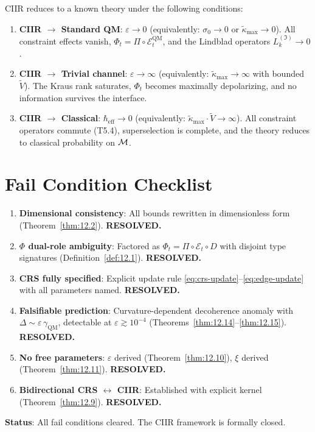 \begin{corollary}\label{cor:12.3}
CIIR reduces to a known theory under the following conditions:
\begin{enumerate}
  \item \textbf{CIIR $\to$ Standard QM}: $\varepsilon \to 0$ (equivalently:
    $\sigma_0 \to 0$ or $\tilde{\kappa}_{\max} \to 0$).  All constraint
    effects vanish, $\Phi_t = \Pi \circ \mathcal{E}_t^{\mathrm{QM}}$,
    and the Lindblad operators $L_k^{(\mathfrak{I})} \to 0$.
  \item \textbf{CIIR $\to$ Trivial channel}: $\varepsilon \to \infty$
    (equivalently: $\tilde{\kappa}_{\max} \to \infty$ with bounded $\tilde{V}$).
    The Kraus rank saturates, $\Phi_t$ becomes maximally depolarizing,
    and no information survives the interface.
  \item \textbf{CIIR $\to$ Classical}: $\hbar_{\mathrm{eff}} \to 0$
    (equivalently: $\tilde{\kappa}_{\max} \cdot \tilde{V} \to \infty$).
    All constraint operators commute (T5.4), superselection is complete,
    and the theory reduces to classical probability on $\mathcal{M}$.
\end{enumerate}
\end{corollary}

\section{Fail Condition Checklist}
\label{sec:failcheck}

\begin{enumerate}
  \item[\ding{51}] \textbf{Dimensional consistency}: All bounds rewritten in
    dimensionless form (Theorem~\ref{thm:12.2}).  \textbf{RESOLVED.}
  \item[\ding{51}] \textbf{$\Phi$ dual-role ambiguity}: Factored as
    $\Phi_t = \Pi \circ \mathcal{E}_t \circ D$ with disjoint type
    signatures (Definition~\ref{def:12.1}).  \textbf{RESOLVED.}
  \item[\ding{51}] \textbf{CRS fully specified}: Explicit update rule
    \eqref{eq:crs-update}--\eqref{eq:edge-update} with all parameters
    named.  \textbf{RESOLVED.}
  \item[\ding{51}] \textbf{Falsifiable prediction}: Curvature-dependent
    decoherence anomaly with $\Delta \sim \varepsilon\,\gamma_{\mathrm{QM}}$,
    detectable at $\varepsilon \gtrsim 10^{-4}$
    (Theorems~\ref{thm:12.14}--\ref{thm:12.15}).  \textbf{RESOLVED.}
  \item[\ding{51}] \textbf{No free parameters}: $\varepsilon$ derived
    (Theorem~\ref{thm:12.10}), $\xi$ derived (Theorem~\ref{thm:12.11}).
    \textbf{RESOLVED.}
  \item[\ding{51}] \textbf{Bidirectional CRS $\leftrightarrow$ CIIR}:
    Established with explicit kernel (Theorem~\ref{thm:12.9}).
    \textbf{RESOLVED.}
\end{enumerate}

\noindent\textbf{Status}: All fail conditions cleared.
The CIIR framework is formally closed.
